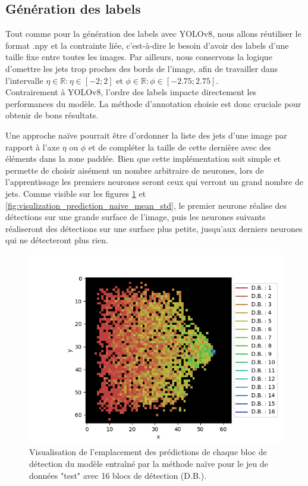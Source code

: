 \subsection{Génération des labels}
\label{subsec:resnet18+head_label_generation}

Tout comme pour la génération des labels avec YOLOv8, nous allons réutiliser le format .npy et la contrainte liée, c'est-à-dire le besoin d'avoir des labels d'une taille fixe entre toutes les images. Par ailleurs, nous conservons la logique d'omettre les jets trop proches des bords de l'image, afin de travailler dans l'intervalle $\eta \in \mathbb{R} : \eta \in [-2;2]$ et $\phi \in \mathbb{R} : \phi \in [-2.75;2.75]$.\\

Contrairement à YOLOv8, l'ordre des labels impacte directement les performances du modèle. La méthode d'annotation choisie est donc cruciale pour obtenir de bons résultats.

Une approche naïve pourrait être d'ordonner la liste des jets d'une image par rapport à l'axe $\eta$ ou $\phi$ et de compléter la taille de cette dernière avec des éléments dans la zone paddée. Bien que cette implémentation soit simple et permette de choisir aisément un nombre arbitraire de neurones, lors de l'apprentissage les premiers neurones seront ceux qui verront un grand nombre de jets. Comme visible sur les figures \ref{fig:visulization_prediction_naive} et \ref{fig:visulization_prediction_naive_mean_std}, le premier neurone réalise des détections sur une grande surface de l'image, puis les neurones suivants réaliseront des détections sur une surface plus petite, jusqu'aux derniers neurones qui ne détecteront plus rien.\\

\begin{figure}[hbt!]
    \centering
    \includegraphics[scale=0.7]{Figures/visulization_prediction_naive.png}
    \caption{Visualisation de l'emplacement des prédictions de chaque bloc de détection du modèle entraîné par la méthode naïve pour le jeu de données "test" avec 16 blocs de détection (D.B.).}
    \label{fig:visulization_prediction_naive}
\end{figure}

